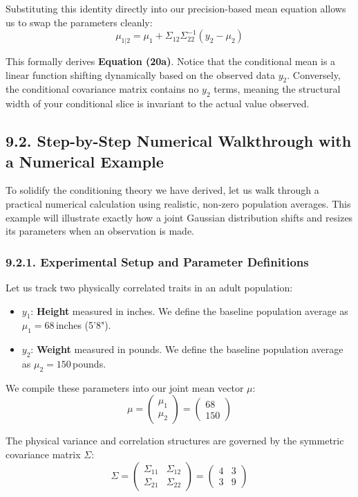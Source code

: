 \documentclass{article}
\begin{document}
Substituting this identity directly into our precision-based mean equation allows us to swap the parameters cleanly:
\[ \mu_{1|2} = \mu_1 + \Sigma_{12} \Sigma_{22}^{-1} (y_2 - \mu_2) \]

This formally derives \textbf{Equation (20a)}. Notice that the conditional mean is a linear function shifting dynamically based on the observed data $y_2$. Conversely, the conditional covariance matrix contains no $y_2$ terms, meaning the structural width of your conditional slice is invariant to the actual value observed.

\subsection*{9.2. Step-by-Step Numerical Walkthrough with a Numerical Example}

To solidify the conditioning theory we have derived, let us walk through a practical numerical calculation using realistic, non-zero population averages. This example will illustrate exactly how a joint Gaussian distribution shifts and resizes its parameters when an observation is made.

\subsubsection*{9.2.1. Experimental Setup and Parameter Definitions}

Let us track two physically correlated traits in an adult population:
\begin{itemize}
    \item $y_1$: \textbf{Height} measured in inches. We define the baseline population average as $\mu_1 = 68$\,inches (5'8").
    \item $y_2$: \textbf{Weight} measured in pounds. We define the baseline population average as $\mu_2 = 150$\,pounds.
\end{itemize}

We compile these parameters into our joint mean vector $\mu$:
\[ \mu = \begin{pmatrix} \mu_1 \\ \mu_2 \end{pmatrix} = \begin{pmatrix} 68 \\ 150 \end{pmatrix} \]

The physical variance and correlation structures are governed by the symmetric covariance matrix $\Sigma$:
\[ \Sigma = \begin{pmatrix} \Sigma_{11} & \Sigma_{12} \\ \Sigma_{21} & \Sigma_{22} \end{pmatrix} = \begin{pmatrix} 4 & 3 \\ 3 & 9 \end{pmatrix} \]
\end{document}
